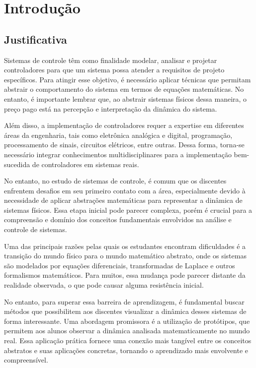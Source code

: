 
\chapter{Introdução}
\label{ch:intro}

\section{Justificativa}

Sistemas de controle têm como finalidade modelar, analisar e projetar controladores para que um sistema possa atender a requisitos de projeto específicos. Para atingir esse objetivo, é necessário aplicar técnicas que permitam abstrair o comportamento do sistema em termos de equações matemáticas. No entanto, é importante lembrar que, ao abstrair sistemas físicos dessa maneira, o preço pago está na percepção e interpretação da dinâmica do sistema.

Além disso, a implementação de controladores requer a expertise em diferentes áreas da engenharia, tais como eletrônica analógica e digital, programação, processamento de sinais, circuitos elétricos, entre outras. Dessa forma, torna-se necessário integrar conhecimentos multidisciplinares para a implementação bem-sucedida de controladores em sistemas reais.

No entanto, no estudo de sistemas de controle, é comum que os discentes enfrentem desafios em seu primeiro contato com a área, especialmente devido à necessidade de aplicar abstrações matemáticas para representar a dinâmica de sistemas físicos. Essa etapa inicial pode parecer complexa, porém é crucial para a compreensão e domínio dos conceitos fundamentais envolvidos na análise e controle de sistemas.

Uma das principais razões pelas quais os estudantes encontram dificuldades é a transição do mundo físico para o mundo matemático abstrato, onde os sistemas são modelados por equações diferenciais, transformadas de Laplace e outros formalismos matemáticos. Para muitos, essa mudança pode parecer distante da realidade observada, o que pode causar alguma resistência inicial.

No entanto, para superar essa barreira de aprendizagem, é fundamental buscar métodos que possibilitem aos discentes visualizar a dinâmica desses sistemas de forma interessante. Uma abordagem promissora é a utilização de protótipos, que permitem aos alunos observar a dinâmica analisada matematicamente no mundo real. Essa aplicação prática fornece uma conexão mais tangível entre os conceitos abstratos e suas aplicações concretas, tornando o aprendizado mais envolvente e compreensível.

